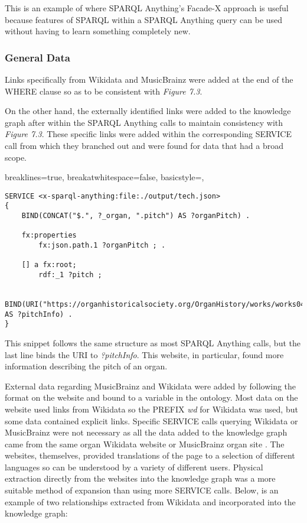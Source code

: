 This is an example of where SPARQL Anything's Facade-X approach is useful because features of SPARQL within a SPARQL Anything query can be used without having to learn something completely new. 

\subsubsection{General Data}
\hspace*{0.5cm} Links specifically from Wikidata and MusicBrainz were added at the end of the WHERE clause so as to be consistent with \textit{Figure 7.3}.

On the other hand, the externally identified links were added to the knowledge graph after within the SPARQL Anything calls to maintain consistency with \textit{Figure 7.3}. These specific links were added within the corresponding SERVICE call from which they branched out and were found for data that had a broad scope. 

\lstset
{
    breaklines=true,
    breakatwhitespace=false,
    basicstyle=\linespread{1.5}\ttfamily,
}
\begin{lstlisting}
SERVICE <x-sparql-anything:file:./output/tech.json>
{
    BIND(CONCAT("$.", ?_organ, ".pitch") AS ?organPitch) .

    fx:properties
        fx:json.path.1 ?organPitch ; .

    [] a fx:root; 
        rdf:_1 ?pitch ;
    
    BIND(URI("https://organhistoricalsociety.org/OrganHistory/works/works04.htm") AS ?pitchInfo) .
} 
\end{lstlisting}

This snippet follows the same structure as most SPARQL Anything calls, but the last line binds the URI to \textit{?pitchInfo}. This website, in particular, found more information describing the pitch of an organ. 

External data regarding MusicBrainz and Wikidata were added by following the format on the website and bound to a variable in the ontology. Most data on the website used links from Wikidata so the PREFIX \textit{wd} for Wikidata was used, but some data contained explicit links. Specific SERVICE calls querying Wikidata or MusicBrainz were not necessary as all the data added to the knowledge graph came from the same organ Wikidata website \cite{organwikidata} or MusicBrainz organ site \cite{organmusicbrainz}. The websites, themselves, provided translations of the page to a selection of different languages so can be understood by a variety of different users. Physical extraction directly from the websites into the knowledge graph was a more suitable method of expansion than using more SERVICE calls. Below, is an example of two relationships extracted from Wikidata and incorporated into the knowledge graph:

